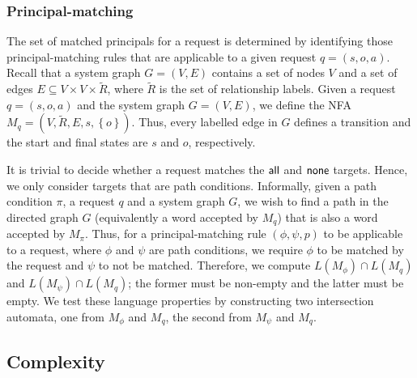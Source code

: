 \documentclass{article}
\newcommand{\set}[1]{\ensuremath{\left\{#1\right\}}} \newcommand{\setO}[1]{\ensuremath{\left\{#1\right.}} \newcommand{\setC}[1]{\ensuremath{\left.#1\right\}}} \newcommand{\setN}[1]{\ensuremath{\left.#1\right.}} \newcommand{\sett}[1]{\ensuremath{\left\{\textit{#1}\right\}}} \newcommand{\tuple}[1]{\ensuremath{\left(#1\right)}} \newcommand{\tuplet}[1]{\ensuremath{\left(\textit{#1}\right)}} \newcommand{\card}[1]{\left| #1 \right|}
\newcommand{\RcoR}{\ensuremath{\widetilde{R}}} \newcommand{\entity}[1]{\ensuremath{#1}} \newcommand{\rel}[1]{\ensuremath{#1}} \newcommand{\relw}[1]{\textsf{#1}} \newcommand{\comp}{\mathbin{;}} \newcommand{\relpc}[1]{\textsf{#1}} \newcommand{\princ}[1]{\textsf{#1}} \newcommand{\ppmc}{\ensuremath{\phi}} \newcommand{\npmc}{\ensuremath{\psi}} \newcommand{\pmp}{\ensuremath{\rho}} \newcommand{\act}[1]{\textsf{#1}} \newcommand{\crs}{\ensuremath{\chi}} \newcommand{\crso}[1]{\textsf{#1}} \newcommand{\defo}[1]{#1} \newcommand{\mpalg}{\textsf{MatchPrincipal}\xspace} \renewcommand{\algorithmiccomment}[1]{// #1} \newcommand{\audita}[1]{\ensuremath{#1^\oplus}}
\begin{document}
\subsubsection{Principal-matching}

The set of matched principals for a request is determined by identifying those principal-matching rules that are applicable to a given request $q = (s,o,a)$.
Recall that a system graph $G = (V,E)$ contains a set of nodes $V$ and a set of edges \mbox{$E \subseteq V \times V \times \RcoR$}, where $\RcoR$ is the set of relationship labels.
Given a request $q = (s,o,a)$ and the system graph $G = (V,E)$, we define the NFA $M_{q} = (V, \RcoR, E, s, \set{o})$.
Thus, every labelled edge in $G$ defines a transition and the start and final states are $s$ and $o$, respectively.

It is trivial to decide whether a request matches the $\mathsf{all}$ and $\mathsf{none}$ targets.
Hence, we only consider targets that are path conditions.
Informally, given a path condition $\pi$, a request $q$ and a system graph $G$, we wish to find a path in the directed graph $G$ (equivalently a word accepted by $M_q$) that is also a word accepted by $M_\pi$.
Thus, for a principal-matching rule $(\ppmc,\npmc,p)$ to be applicable to a request, where $\ppmc$ and $\npmc$ are path conditions, we require $\ppmc$ to be matched by the request and $\npmc$ to not be matched.
Therefore, we compute $L(M_{\ppmc}) \cap L(M_q)$ and $L(M_{\npmc}) \cap L(M_q)$; the former must be non-empty  and the latter must be empty.
We test these language properties by constructing two intersection automata, one from $M_{\ppmc}$ and $M_q$, the second from $M_{\npmc}$ and $M_q$.

\subsection{Complexity}\label{sec:requests:correctness_and_complexity}
\end{document}
